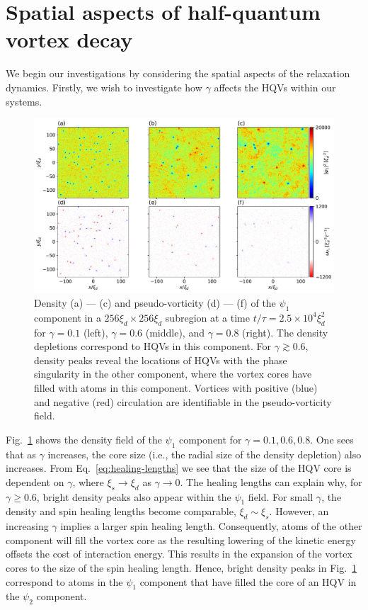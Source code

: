 \section{Spatial aspects of half-quantum vortex decay}
We begin our investigations by considering the spatial aspects of the
relaxation dynamics.
Firstly, we wish to investigate how \(\gamma \) affects the HQVs within our
systems.
\begin{figure}
    \centering
    \includegraphics[width=\textwidth]{gfx/ch-twoCompDynamics/densVort.pdf}
    \caption[Density and pseudo-vorticity of at late simulation time for various
        \(\gamma \)]
    {\label{fig:density-pseudo-vort}Density (a) --- (c) and pseudo-vorticity
        (d) --- (f) of the \(\psi_1 \) component in a
        \(256\xi_d \times 256\xi_d\) subregion at a time
        \(t/\tau=2.5\times 10^4\xi_d^2\) for \(\gamma=0.1\) (left),
        \(\gamma=0.6\) (middle), and \(\gamma=0.8\) (right).
        The density depletions correspond to HQVs in this component.
        For \(\gamma \gtrsim 0.6\), density peaks reveal the locations of HQVs
        with the phase singularity in the other component, where the vortex
        cores have filled with atoms in this component.
        Vortices with positive (blue) and negative (red) circulation are
        identifiable in the pseudo-vorticity field.}
\end{figure}
Fig.~\ref{fig:density-pseudo-vort} shows the density field of the \(\psi_1 \)
component for \(\gamma = 0.1, 0.6, 0.8\).
One sees that as \(\gamma \) increases, the core size (i.e., the radial size of
the density depletion) also increases.
From Eq.~\eqref{eq:healing-lengths} we see that the size of the HQV core is
dependent on \(\gamma \), where \(\xi_s \rightarrow \xi_d\) as
\(\gamma \rightarrow 0\).
The healing lengths can explain why, for \(\gamma \geq 0.6\), bright density
peaks also appear within the \(\psi_1 \) field.
For small \(\gamma \), the density and spin healing lengths become comparable,
\(\xi_d \sim \xi_s\).
However, an increasing \(\gamma \) implies a larger spin healing length.
Consequently, atoms of the other component will fill the vortex core as the
resulting lowering of the kinetic energy offsets the cost of interaction energy.
This results in the expansion of the vortex cores to the size of the spin
healing length.
Hence, bright density peaks in Fig.~\ref{fig:density-pseudo-vort} correspond to
atoms in the \(\psi_1 \) component that have filled the core of an HQV in the
\(\psi_2\) component.

